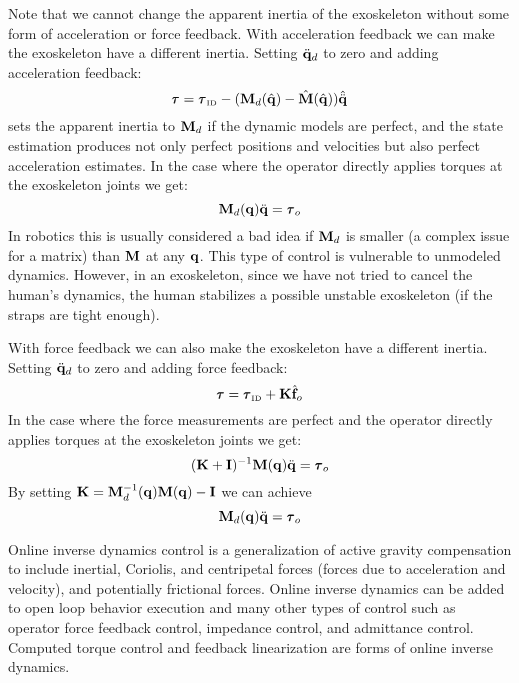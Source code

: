 \documentclass[letterpaper,12pt,fullpage]{article}
\newcommand{\invdyn}{{\mbox {\tiny ID}}}
\begin{document}
Note that we cannot change the apparent inertia of the exoskeleton without
some form of acceleration or force feedback.
With acceleration feedback we can make the exoskeleton have a different inertia.
Setting $\ddot{{\bf q}}_d$ to zero and adding acceleration feedback:
\begin{equation}
\vtau = \vtau_{\invdyn} - (\mM_d(\hat{\vq}) - \hat{\mM}(\hat{\vq})) \hat{\ddot{\vq}}
\label{eq:change-inertia1}
\end{equation}
sets the apparent inertia to ${\bf M}_d$ if the dynamic models are perfect, and
the state estimation produces not only perfect positions and velocities but
also perfect acceleration estimates. In the case 
where the operator directly applies torques at the
exoskeleton joints we get:
\begin{equation}
\mM_d (\vq) \ddot{\vq} = \vtau_o
\end{equation}
In robotics this is usually considered a bad idea if ${\bf M}_d$ is smaller (a complex
issue for a matrix) than ${\bf M}$ at any ${\bf q}$. This type of control is vulnerable
to unmodeled dynamics. However, in an exoskeleton, since we have not tried to
cancel the human's dynamics, the human stabilizes a possible unstable exoskeleton
(if the straps are tight enough).

With force feedback we can also make the exoskeleton have a different inertia.
Setting $\ddot{{\bf q}}_d$ to zero and adding force feedback:
\begin{equation}
\vtau = \vtau_{\invdyn} + \mK \hat{\vf}_o
\end{equation}
In the case where the force measurements are perfect and 
the operator directly applies torques at the
exoskeleton joints we get:
\begin{equation}
(\mK + \mI)^{-1} \mM (\vq) \ddot{\vq} = \vtau_o
\end{equation}
By setting ${\bf K} = {\bf M}^{-1}_d ({\bf q}) {\bf M} ({\bf q}) - {\bf I}$ we can achieve
\begin{equation}
\mM_d (\vq) \ddot{\vq} = \vtau_o
\end{equation}

Online inverse dynamics control is a generalization of 
active gravity compensation to include
inertial, Coriolis, and centripetal forces (forces due to acceleration and
velocity), and potentially frictional forces.
Online inverse dynamics can be added to open loop behavior execution
and many other types of control such as operator force
feedback control, impedance control, and admittance control.
Computed torque control and feedback linearization are forms of online
inverse dynamics.
\end{document}
